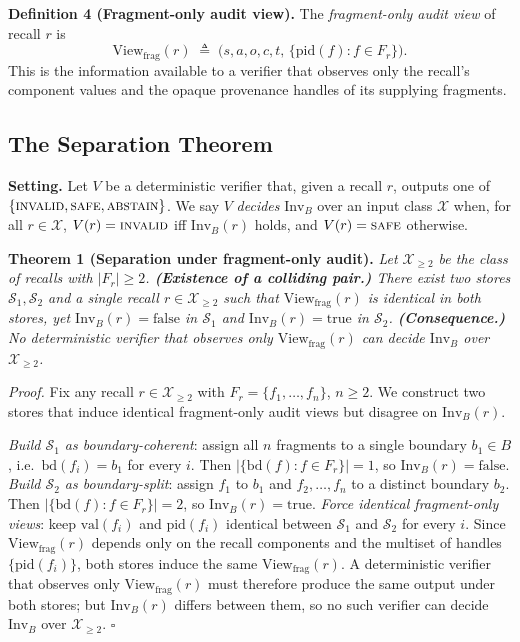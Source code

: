 \documentclass[conference,compsoc]{IEEEtran}
\begin{document}
\textbf{Definition 4 (Fragment-only audit view).} The \emph{fragment-only audit view} of recall $r$ is
\begin{equation}
\mathrm{View}_{\mathrm{frag}}(r) \;\triangleq\; \bigl(s, a, o, c, t,\, \{\mathrm{pid}(f) : f \in F_{r}\}\bigr).
\end{equation}
This is the information available to a verifier that observes only the recall's component values and the opaque provenance handles of its supplying fragments.

\subsection{The Separation Theorem}

\smallskip
\noindent\textbf{Setting.} Let $V$ be a deterministic verifier that, given a recall $r$, outputs one of $\{\textsc{invalid},\textsc{safe},\textsc{abstain}\}$. We say $V$ \emph{decides} $\mathrm{Inv}_{B}$ over an input class $\mathcal{X}$ when, for all $r \in \mathcal{X}$, $V(r) = \textsc{invalid}$ iff $\mathrm{Inv}_{B}(r)$ holds, and $V(r) = \textsc{safe}$ otherwise.

\smallskip
\noindent\textbf{Theorem 1 (Separation under fragment-only audit).}
\emph{Let $\mathcal{X}_{\geq 2}$ be the class of recalls with $|F_{r}| \geq 2$. \textbf{(Existence of a colliding pair.)} There exist two stores $\mathcal{S}_{1}, \mathcal{S}_{2}$ and a single recall $r \in \mathcal{X}_{\geq 2}$ such that $\mathrm{View}_{\mathrm{frag}}(r)$ is identical in both stores, yet $\mathrm{Inv}_{B}(r) = \mathrm{false}$ in $\mathcal{S}_{1}$ and $\mathrm{Inv}_{B}(r) = \mathrm{true}$ in $\mathcal{S}_{2}$. \textbf{(Consequence.)} No deterministic verifier that observes only $\mathrm{View}_{\mathrm{frag}}(r)$ can decide $\mathrm{Inv}_{B}$ over $\mathcal{X}_{\geq 2}$.}

\smallskip
\textit{Proof.} Fix any recall $r \in \mathcal{X}_{\geq 2}$ with $F_{r} = \{f_{1}, \dots, f_{n}\}$, $n \geq 2$. We construct two stores that induce identical fragment-only audit views but disagree on $\mathrm{Inv}_{B}(r)$.

\emph{Build $\mathcal{S}_{1}$ as boundary-coherent}: assign all $n$ fragments to a single boundary $b_{1} \in B$, i.e.\ $\mathrm{bd}(f_{i}) = b_{1}$ for every $i$. Then $|\{\mathrm{bd}(f) : f \in F_{r}\}| = 1$, so $\mathrm{Inv}_{B}(r) = \mathrm{false}$. \emph{Build $\mathcal{S}_{2}$ as boundary-split}: assign $f_{1}$ to $b_{1}$ and $f_{2}, \dots, f_{n}$ to a distinct boundary $b_{2}$. Then $|\{\mathrm{bd}(f) : f \in F_{r}\}| = 2$, so $\mathrm{Inv}_{B}(r) = \mathrm{true}$. \emph{Force identical fragment-only views}: keep $\mathrm{val}(f_{i})$ and $\mathrm{pid}(f_{i})$ identical between $\mathcal{S}_{1}$ and $\mathcal{S}_{2}$ for every $i$. Since $\mathrm{View}_{\mathrm{frag}}(r)$ depends only on the recall components and the multiset of handles $\{\mathrm{pid}(f_{i})\}$, both stores induce the same $\mathrm{View}_{\mathrm{frag}}(r)$. A deterministic verifier that observes only $\mathrm{View}_{\mathrm{frag}}(r)$ must therefore produce the same output under both stores; but $\mathrm{Inv}_{B}(r)$ differs between them, so no such verifier can decide $\mathrm{Inv}_{B}$ over $\mathcal{X}_{\geq 2}$. \hfill$\square$
\end{document}
